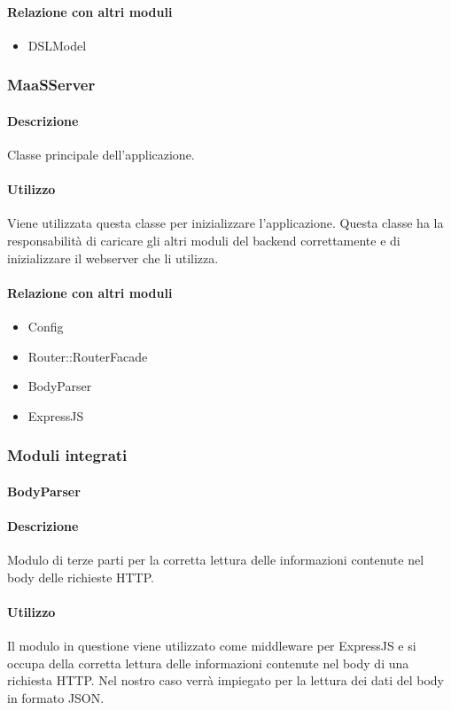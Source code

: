 \paragraph*{Relazione con altri moduli}
\begin{itemize}
\item DSLModel
\end{itemize}

\subsubsection{MaaSServer}
\paragraph*{Descrizione}
Classe principale dell'applicazione.

\paragraph*{Utilizzo}
Viene utilizzata questa classe per inizializzare l'applicazione. Questa classe ha la responsabilità di caricare gli altri moduli del backend correttamente e di inizializzare il webserver che li utilizza.
\paragraph*{Relazione con altri moduli}
\begin{itemize}
\item Config
\item Router::RouterFacade
\item BodyParser
\item ExpressJS
\end{itemize}


\subsubsection{Moduli integrati}
\paragraph{BodyParser}
\paragraph*{Descrizione}
Modulo di terze parti per la corretta lettura delle informazioni contenute nel body delle richieste HTTP.

\paragraph*{Utilizzo}
Il modulo in questione viene utilizzato come middleware per ExpressJS e si occupa della corretta lettura delle informazioni contenute nel body di una richiesta HTTP. Nel nostro caso verrà impiegato per la lettura dei dati del body in formato JSON.


